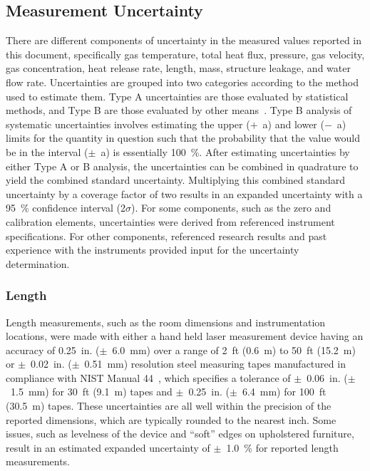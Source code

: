 \documentclass[12pt,oneside]{book}
\begin{document}
\subsection{Measurement Uncertainty}
\label{subsec:uncertainty}

There are different components of uncertainty in the measured values reported in this document, specifically gas temperature, total heat flux, pressure, gas velocity, gas concentration, heat release rate, length, mass, structure leakage, and water flow rate. Uncertainties are grouped into two categories according to the method used to estimate them. Type A uncertainties are those evaluated by statistical methods, and Type B are those evaluated by other means~\cite{Taylor&Kuyatt:1994}. Type B analysis of systematic uncertainties involves estimating the upper ($+$~a) and lower ($-$~a) limits for the quantity in question such that the probability that the value would be in the interval ($\pm$~a) is essentially 100~\%. After estimating uncertainties by either Type A or B analysis, the uncertainties can be combined in quadrature to yield the combined standard uncertainty. Multiplying this combined standard uncertainty by a coverage factor of two results in an expanded uncertainty with a 95~\% confidence interval (2$\sigma$). For some components, such as the zero and calibration elements, uncertainties were derived from referenced instrument specifications. For other components, referenced research results and past experience with the instruments provided input for the uncertainty determination.

\subsubsection*{Length}
Length measurements, such as the room dimensions and instrumentation locations, were made with either a hand held laser measurement device having an accuracy of 0.25~in. ($\pm$~6.0~mm) over a range of 2~ft (0.6~m) to 50~ft (15.2~m)~\cite{StanleyTools} or $\pm$~0.02~in. ($\pm$~0.51~mm) resolution steel measuring tapes manufactured in compliance with NIST Manual 44~\cite{Butcher:2012}, which specifies a tolerance of $\pm$~0.06~in. ($\pm$~1.5~mm) for 30~ft (9.1~m) tapes and $\pm$~0.25~in. ($\pm$~6.4~mm) for 100~ft (30.5~m) tapes. These uncertainties are all well within the precision of the reported dimensions, which are typically rounded to the nearest inch. Some issues, such as levelness of the device and ``soft'' edges on upholstered furniture, result in an estimated expanded uncertainty of $\pm$~1.0~\% for reported length measurements.
\end{document}
